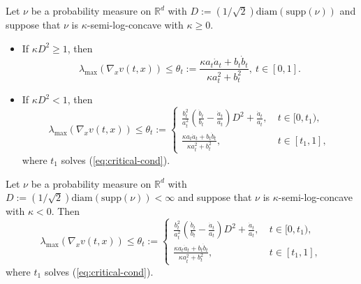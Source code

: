 \documentclass[twoside,11pt]{article}
\def\sR{{\mathbb{R}}}
\def\paref#1{(\ref{#1})}
\numberwithin{equation}{section}
\begin{document}
\begin{corollary} \label{cor:pos-kappa-bd}
Let $\nu$ be a probability measure on $\sR^d$ with $D :=
(1/\sqrt{2}) \mathrm{diam} ( \mathrm{supp}(\nu))$ and suppose that $\nu$ is $\kappa$-semi-log-concave with $\kappa \ge 0$.
\begin{itemize}
    \item[(a)] If $\kappa D^2 \ge 1$, then
        \begin{equation}
            \label{eq:max-egv-ubd-ge1}
            \lambda_{\max} (\nabla_x v(t, x)) \le \theta_t := \frac{\kappa a_t \dot{a}_t + b_t \dot{b}_t} {\kappa a_t^2 + b_t^2}, \ t \in [0, 1].
        \end{equation}

    \item[(b)] If $\kappa D^2 < 1$, then
        \begin{equation}
            \label{eq:max-egv-ubd-less1}
            \lambda_{\max} (\nabla_x v(t, x)) \le \theta_t :=
                \begin{cases}
                    \frac{b_t^2}{a_t^2} \left( \frac{\dot{b}_t}{b_t} - \frac{\dot{a}_t}{a_t} \right) D^2 + \frac{\dot{a}_t} {a_t}, \ &t \in [0, t_1), \\
                    \frac{\kappa a_t \dot{a}_t + b_t \dot{b}_t} {\kappa a_t^2 + b_t^2},  \ &t \in [t_1, 1],
                \end{cases}
        \end{equation}
        where $t_1$ solves  \paref{eq:critical-cond}.
\end{itemize}
\end{corollary}


\begin{corollary} \label{cor:neg-kappa-bd}
Let $\nu$ be a probability measure on $\sR^d$ with $D :=  (1/\sqrt{2}) \mathrm{diam} (\mathrm{supp}(\nu)) < \infty$ and suppose that $\nu$ is $\kappa$-semi-log-concave with $\kappa < 0$.
Then
\begin{equation}
    \label{eq:max-egv-ubd-kappa-nega}
    \lambda_{\max} (\nabla_x v(t, x)) \le \theta_t :=
    \begin{cases}
        \frac{b_t^2}{a_t^2} \left( \frac{\dot{b}_t}{b_t} - \frac{\dot{a}_t}{a_t} \right) D^2 + \frac{\dot{a}_t} {a_t}, \ &t \in [0, t_1), \\
        \frac{\kappa a_t \dot{a}_t + b_t \dot{b}_t} {\kappa a_t^2 + b_t^2},  \ &t \in [t_1, 1],
    \end{cases}
\end{equation}
where $t_1$ solves \paref{eq:critical-cond}.
\end{corollary}
\end{document}
